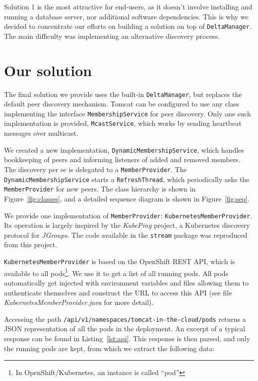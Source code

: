 \documentclass[11pt,a4paper]{article}
\begin{document}
Solution 1 is the most attractive for end-users, as it doesn't involve installing and running a database server, nor additional software dependencies. This is why we decided to concentrate our efforts on building a solution on top of \texttt{DeltaManager}. The main difficulty was implementing an alternative discovery process.

\section{Our solution}

The final solution we provide uses the built-in \texttt{DeltaManager}, but replaces the default peer discovery mechanism. Tomcat can be configured to use any class implementing the interface \texttt{MembershipService} for peer discovery. Only one such implementation is provided, \texttt{McastService}, which works by sending heartbeat messages over multicast.

We created a new implementation, \texttt{DynamicMembershipService}, which handles bookkeeping of peers and informing listeners of added and removed members. The discovery per se is delegated to a \texttt{MemberProvider}. The \texttt{DynamicMembershipService} starts a \texttt{RefreshThread}, which periodically asks the \texttt{MemberProvider} for new peers. The class hierarchy is shown in Figure~\ref{fig:classes}, and a detailed sequence diagram is shown in Figure~\ref{fig:seq}.

We provide one implementation of \texttt{MemberProvider}: \texttt{KubernetesMemberProvider}. Its operation is largely inspired by the \emph{KubePing} project\autocite{kubeping}, a Kubernetes discovery protocol for \emph{JGroups}. The code available in the \texttt{stream} package was reproduced from this project.

\texttt{KubernetesMemberProvider} is based on the OpenShift REST API\autocite{openshift-api}, which is available to all pods\footnote{In OpenShift/Kubernetes, an instance is called ``pod''}. We use it to get a list of all running pods. All pods automatically get injected with environment variables and files allowing them to authenticate themselves and construct the URL to access this API (see file \emph{KubernetesMemberProvider.java} for more detail).

Accessing the path \texttt{/api/v1/namespaces/tomcat-in-the-cloud/pods} returns a JSON representation of all the pods in the deployment. An excerpt of a typical response can be found in Listing~\ref{lst:api}. This response is then parsed, and only the running pods are kept, from which we extract the following data:
\end{document}

